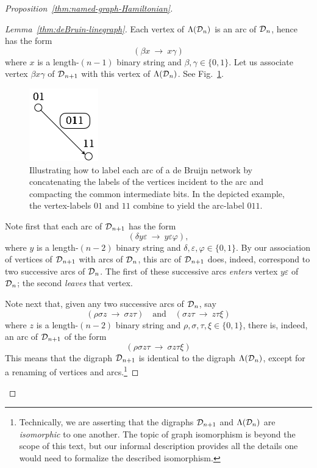 \begin{proof}[Proposition~\ref{thm:named-graph-Hamiltonian}]
\begin{proof}[Lemma~\ref{thm:deBruin-linegraph}]
Each vertex of $\Lambda(\mbox{$\cal D$}_n)$ is an arc of $\mbox{$\cal D$}_n$, hence has the form
\[ (\beta x \ \rightarrow \ x \gamma) \]
where $x$ is a length-$(n-1)$ binary string and $\beta, \gamma \in \{0,1\}$.  Let us associate vertex $\beta x \gamma$ of $\mbox{$\cal D$}_{n+1}$ with this vertex of $\Lambda(\mbox{$\cal D$}_n)$.  See Fig.~\ref{fig:dBlabelEdge-App}.
\begin{figure}[hbt]
\begin{center}
       \includegraphics[scale=0.45]{FiguresGraph/dBlabelEdge}
\caption{Illustrating how to label each arc of a de Bruijn network by concatenating the labels of the vertices incident to the arc and compacting the common intermediate bits.  In the depicted example, the vertex-labels $01$ and $11$ combine to yield the arc-label $011$.}
  \label{fig:dBlabelEdge-App}
\end{center}
\end{figure}

\smallskip

Note first that each arc of $\mbox{$\cal D$}_{n+1}$ has the form
\[ (\delta y \varepsilon \ \rightarrow \ y \varepsilon \varphi), \]
where $y$ is a length-$(n-2)$ binary string and $\delta, \varepsilon, \varphi \in \{0,1\}$.  By our association of vertices of $\mbox{$\cal D$}_{n+1}$ with arcs of $\mbox{$\cal D$}_n$, this arc of $\mbox{$\cal D$}_{n+1}$ does, indeed, correspond to two successive arcs of $\mbox{$\cal D$}_n$.   The first of these successive arcs {\em enters} vertex $y \varepsilon$ of $\mbox{$\cal D$}_n$; the second {\em leaves} that vertex.

\smallskip

Note next that, given any two successive arcs of $\mbox{$\cal D$}_n$, say
\[
(\rho \sigma z \ \rightarrow \ \sigma z \tau) \ \ \ \mbox { and } \ \ \
(\sigma z \tau \ \rightarrow \  z \tau \xi)
\]
where $z$ is a length-$(n-2)$ binary string and $\rho, \sigma, \tau, \xi \in \{0,1\}$, there is, indeed, an arc of $\mbox{$\cal D$}_{n+1}$ of the form
\[ (\rho \sigma z \tau \ \rightarrow \ \sigma z \tau \xi) \]
This means that the digraph $\mbox{$\cal D$}_{n+1}$ is identical to the digraph $\Lambda(\mbox{$\cal D$}_n)$, except for a renaming of vertices and arcs.\footnote{Technically, we are asserting that the digraphs ${\cal D}_{n+1}$ and ${\Lambda}({\cal D}_n)$ are {\it isomorphic} to one another.  The topic of graph isomorphism is beyond the scope of this text, but our informal description provides all the details one would need to formalize the described isomorphism.}


\end{proof}
\end{proof}
